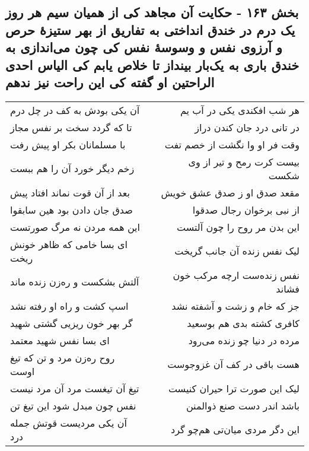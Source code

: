 \begin{center}
\section*{بخش ۱۶۳ - حکایت آن مجاهد کی از همیان سیم هر روز یک درم در خندق انداختی به تفاریق از بهر ستیزهٔ حرص و آرزوی نفس و وسوسهٔ نفس کی چون می‌اندازی به خندق باری به یک‌بار بینداز تا خلاص یابم کی الیاس احدی الراحتین او گفته کی این راحت نیز ندهم}
\label{sec:sh163}
\begin{longtable}{l p{0.5cm} r}
آن یکی بودش به کف در چل درم
&&
هر شب افکندی یکی در آب یم
\\
تا که گردد سخت بر نفس مجاز
&&
در تانی درد جان کندن دراز
\\
با مسلمانان بکر او پیش رفت
&&
وقت فر او وا نگشت از خصم تفت
\\
زخم دیگر خورد آن را هم ببست
&&
بیست کرت رمح و تیر از وی شکست
\\
بعد از آن قوت نماند افتاد پیش
&&
مقعد صدق او ز صدق عشق خویش
\\
صدق جان دادن بود هین سابقوا
&&
از نبی برخوان رجال صدقوا
\\
این همه مردن نه مرگ صورتست
&&
این بدن مر روح را چون آلتست
\\
ای بسا خامی که ظاهر خونش ریخت
&&
لیک نفس زنده آن جانب گریخت
\\
آلتش بشکست و ره‌زن زنده ماند
&&
نفس زنده‌ست ارچه مرکب خون فشاند
\\
اسپ کشت و راه او رفته نشد
&&
جز که خام و زشت و آشفته نشد
\\
گر بهر خون ریزیی گشتی شهید
&&
کافری کشته بدی هم بوسعید
\\
ای بسا نفس شهید معتمد
&&
مرده در دنیا چو زنده می‌رود
\\
روح ره‌زن مرد و تن که تیغ اوست
&&
هست باقی در کف آن غزوجوست
\\
تیغ آن تیغست مرد آن مرد نیست
&&
لیک این صورت ترا حیران کنیست
\\
نفس چون مبدل شود این تیغ تن
&&
باشد اندر دست صنع ذوالمنن
\\
آن یکی مردیست قوتش جمله درد
&&
این دگر مردی میان‌تی هم‌چو گرد
\\
\end{longtable}
\end{center}
